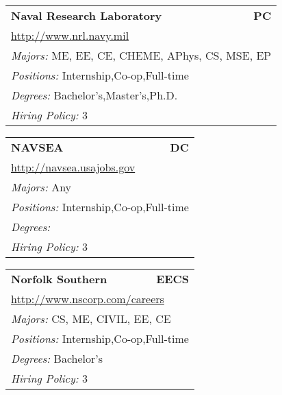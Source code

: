 \documentclass[twoside]{article}
\begin{document}
\begin{center}
\begin{multicols}{3}
\begin{FlushLeft}
\begin{minipage}{.9\columnwidth}
\end{minipage}
 
\begin{minipage}{.9\columnwidth}\begin{tabularx}{.95\columnwidth}{Xr}
                 {\Large\bf Naval Research Laboratory} & {\Large\bf PC}\\
    \multicolumn{2}{p{.95\columnwidth}}{\url{http://www.nrl.navy.mil}}\\
    \multicolumn{2}{p{.95\columnwidth}}{\emph{Majors:} ME, EE, CE, CHEME, APhys, CS, MSE, EP}\\
    \multicolumn{2}{p{.95\columnwidth}}{\emph{Positions:} Internship,Co-op,Full-time}\\
    \multicolumn{2}{p{.95\columnwidth}}{\emph{Degrees:} Bachelor's,Master's,Ph.D.}\\
    \multicolumn{2}{p{.95\columnwidth}}{\emph{Hiring Policy:} 3}\\
    \end{tabularx}
    
\end{minipage}
 
\begin{minipage}{.9\columnwidth}\begin{tabularx}{.95\columnwidth}{Xr}
                 {\Large\bf NAVSEA} & {\Large\bf DC}\\
    \multicolumn{2}{p{.95\columnwidth}}{\url{http://navsea.usajobs.gov}}\\
    \multicolumn{2}{p{.95\columnwidth}}{\emph{Majors:} Any}\\
    \multicolumn{2}{p{.95\columnwidth}}{\emph{Positions:} Internship,Co-op,Full-time}\\
    \multicolumn{2}{p{.95\columnwidth}}{\emph{Degrees:} }\\
    \multicolumn{2}{p{.95\columnwidth}}{\emph{Hiring Policy:} 3}\\
    \end{tabularx}
    
\end{minipage}
 
\begin{minipage}{.9\columnwidth}\begin{tabularx}{.95\columnwidth}{Xr}
                 {\Large\bf Norfolk Southern} & {\Large\bf EECS}\\
    \multicolumn{2}{p{.95\columnwidth}}{\url{http://www.nscorp.com/careers}}\\
    \multicolumn{2}{p{.95\columnwidth}}{\emph{Majors:} CS, ME, CIVIL, EE, CE}\\
    \multicolumn{2}{p{.95\columnwidth}}{\emph{Positions:} Internship,Co-op,Full-time}\\
    \multicolumn{2}{p{.95\columnwidth}}{\emph{Degrees:} Bachelor's}\\
    \multicolumn{2}{p{.95\columnwidth}}{\emph{Hiring Policy:} 3}\\
    \end{tabularx}
    

\end{minipage}
\end{FlushLeft}
\end{multicols}
\end{center}
\end{document}

